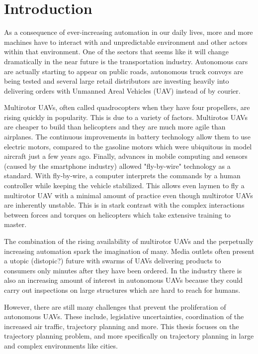 \chapter{Introduction}
As a consequence of ever-increasing automation in our daily lives, more and more machines have to interact with and unpredictable environment and other actors within that environment. One of the sectors that seems like it will change dramatically in the near future is the transportation industry. Autonomous cars are actually starting to appear on public roads, autonomous truck convoys are being tested and several large retail distributors are investing heavily into delivering orders with Unmanned Areal Vehicles (UAV) instead of by courier. 
\par
Multirotor UAVs, often called quadrocopters when they have four propellers, are rising quickly in popularity. This is due to a variety of factors. Multirotos UAVs are cheaper to build than helicopters and they are much more agile than airplanes. The continuous improvements in battery technology allow them to use electric motors, compared to the gasoline motors which were ubiquitous in model aircraft just a few years ago. Finally, advances in mobile computing and sensors (caused by the smartphone industry) allowed "fly-by-wire" technology as a standard. With fly-by-wire, a computer interprets the commands by a human controller while keeping the vehicle stabilized. This allows even laymen to fly a multirotor UAV with a minimal amount of practice even though multirotor UAVs are inherently unstable. This is in stark contrast with the complex interactions between forces and torques on helicopters which take extensive training to master.
\par
The combination of the rising availability of multirotor UAVs and the perpetually increasing automation spark the imagination of many. Media outlets often present a utopic (distopic?) future with swarms of UAVs delivering products to consumers only minutes after they have been ordered. In the industry there is also an increasing amount of interest in autonomous UAVs because they could carry out inspections on large structures which are hard to reach for humans.
\par
However, there are still many challenges that prevent the proliferation of autonomous UAVs. These include, legislative uncertainties, coordination of the increased air traffic, trajectory planning and more. This thesis focuses on the trajectory planning problem, and more specifically on trajectory planning in large and complex environments like cities.
